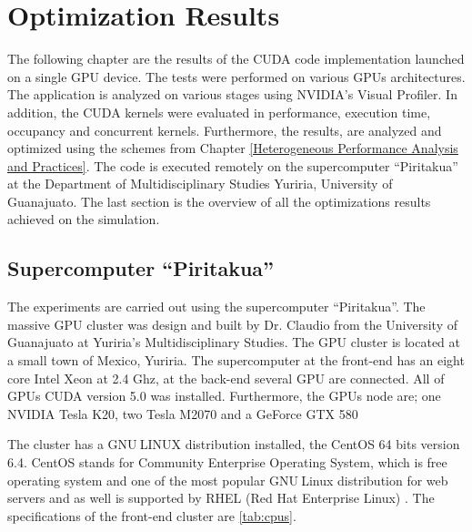 
\chapter{Optimization Results} %

\label{Optimization Results} %


The following chapter are the results of the CUDA code implementation launched on a single GPU device. The tests were performed on various GPUs architectures. The application is analyzed on various stages using NVIDIA's Visual Profiler. In addition, the CUDA kernels were evaluated in performance, execution time, occupancy and concurrent kernels. Furthermore, the results, are analyzed and optimized using the schemes from Chapter \ref{Heterogeneous Performance Analysis and Practices}. The code is executed remotely on the supercomputer ``Piritakua'' at the Department of Multidisciplinary Studies Yuriria, University of Guanajuato. The last section is the overview of all the optimizations results achieved on the simulation.

\section{Supercomputer ``Piritakua''}

The experiments are carried out using the supercomputer “Piritakua”. The massive GPU cluster was design and built by Dr. Claudio from the University of Guanajuato at Yuriria's Multidisciplinary Studies. The GPU cluster is located at a small town of Mexico, Yuriria. The supercomputer at the front-end has an eight core Intel Xeon at 2.4 Ghz, at the back-end several GPU are connected. All of GPUs CUDA version 5.0 was installed. Furthermore, the GPUs node are; one NVIDIA Tesla K20, two Tesla M2070 and a GeForce GTX 580 

The cluster has a GNU$ \ $LINUX distribution installed, the CentOS 64 bits version 6.4. CentOS stands for Community Enterprise Operating System, which is free operating system and one of the most popular GNU$ \ $Linux distribution for web servers and as well is supported by RHEL (Red Hat Enterprise Linux) \cite{centos}. The specifications of the front-end cluster are \ref{tab:cpus}.

